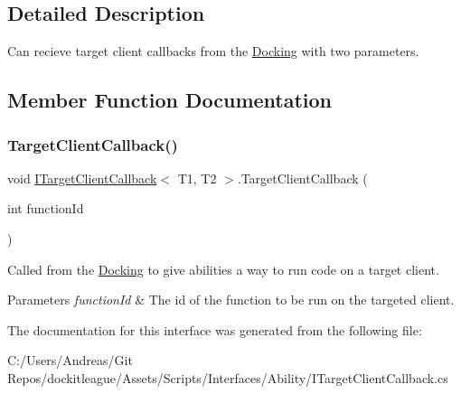 \subsection{Detailed Description}
Can recieve target client callbacks from the \hyperlink{class_docking}{Docking} with two parameters. 



\subsection{Member Function Documentation}
\hypertarget{interface_i_target_client_callback_aecebdc789897a595266e58e872fbb4c2}{}\label{interface_i_target_client_callback_aecebdc789897a595266e58e872fbb4c2} 
\subsubsection{\texorpdfstring{Target\+Client\+Callback()}{TargetClientCallback()}}
{\footnotesize\ttfamily void \hyperlink{interface_i_target_client_callback}{I\+Target\+Client\+Callback}$<$ T1, T2 $>$.Target\+Client\+Callback (\begin{DoxyParamCaption}\item[{int}]{function\+Id }\end{DoxyParamCaption})}



Called from the \hyperlink{class_docking}{Docking} to give abilities a way to run code on a target client. 


\begin{DoxyParams}{Parameters}
{\em function\+Id} & The id of the function to be run on the targeted client.\\
\hline
\end{DoxyParams}


The documentation for this interface was generated from the following file\+:\begin{DoxyCompactItemize}
\item 
C\+:/\+Users/\+Andreas/\+Git Repos/dockitleague/\+Assets/\+Scripts/\+Interfaces/\+Ability/I\+Target\+Client\+Callback.\+cs\end{DoxyCompactItemize}
